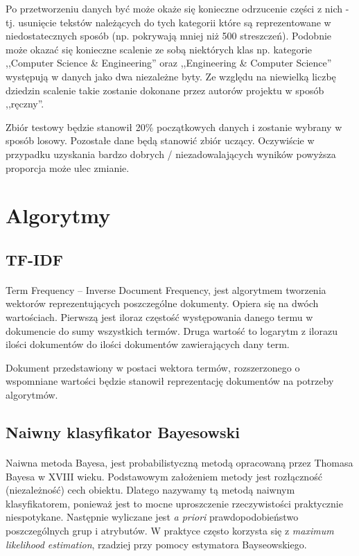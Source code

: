 \documentclass[a4paper,12pt]{article}
\begin{document}
	Po przetworzeniu danych być może okaże się konieczne odrzucenie
	części z nich - tj. usunięcie tekstów należących do tych kategorii 
	które są reprezentowane w niedostatecznych sposób (np. pokrywają
	mniej niż 500 streszczeń). Podobnie może okazać się konieczne 
	scalenie ze sobą niektórych klas np. kategorie ,,Computer Science \& Engineering'' oraz ,,Engineering \& Computer Science'' występują w danych jako dwa niezależne byty. Ze względu na niewielką liczbę
	dziedzin scalenie takie zostanie dokonane przez autorów projektu
	w sposób ,,ręczny''.
	
	Zbiór testowy będzie stanowił 20\% początkowych danych i zostanie
	wybrany w sposób losowy. Pozostałe dane będą stanowić zbiór uczący.
	Oczywiście w przypadku uzyskania bardzo dobrych / niezadowalających
	wyników powyższa proporcja może ulec zmianie.
	

\section{Algorytmy}
\subsection{TF-IDF}
\paragraph{}
Term Frequency – Inverse Document Frequency, jest algorytmem tworzenia
wektorów reprezentujących poszczególne dokumenty. Opiera się na dwóch
wartościach. Pierwszą jest iloraz częstość występowania danego termu w
dokumencie do sumy wszystkich termów. Druga wartość to logarytm z ilorazu
ilości dokumentów do ilości dokumentów zawierających dany term. 

Dokument przedstawiony w postaci wektora termów, rozszerzonego o wspomniane
wartości będzie stanowił reprezentację dokumentów na potrzeby algorytmów. 

\subsection{Naiwny klasyfikator Bayesowski}
\paragraph{}

Naiwna metoda Bayesa, jest probabilistyczną metodą opracowaną przez Thomasa
Bayesa w XVIII wieku. Podstawowym założeniem metody jest rozłączność
(niezależność) cech obiektu. Dlatego nazywamy tą metodą naiwnym
klasyfikatorem, ponieważ jest to mocne uproszczenie rzeczywistości
praktycznie niespotykane. Następnie wyliczane jest \textit{a priori}
prawdopodobieństwo poszczególnych grup i atrybutów. W praktyce często
korzysta się z  \textit{maximum likelihood estimation}, rzadziej przy pomocy
estymatora Bayseowskiego.
\end{document}
